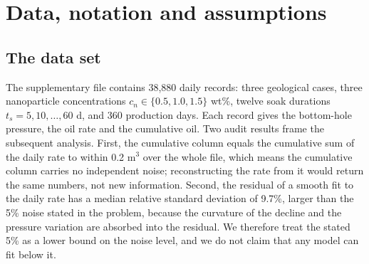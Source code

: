 \documentclass{swmcmthesis}
\begin{document}
\section{Data, notation and assumptions}
\subsection{The data set}
The supplementary file contains 38,880 daily records: three geological cases, three nanoparticle concentrations $c_n\in\{0.5,1.0,1.5\}$ wt\%, twelve soak durations $t_s=5,10,\dots,60$ d, and 360 production days. Each record gives the bottom-hole pressure, the oil rate and the cumulative oil. Two audit results frame the subsequent analysis. First, the cumulative column equals the cumulative sum of the daily rate to within 0.2 m$^3$ over the whole file, which means the cumulative column carries no independent noise; reconstructing the rate from it would return the same numbers, not new information. Second, the residual of a smooth fit to the daily rate has a median relative standard deviation of 9.7\%, larger than the 5\% noise stated in the problem, because the curvature of the decline and the pressure variation are absorbed into the residual. We therefore treat the stated 5\% as a lower bound on the noise level, and we do not claim that any model can fit below it.
\end{document}
